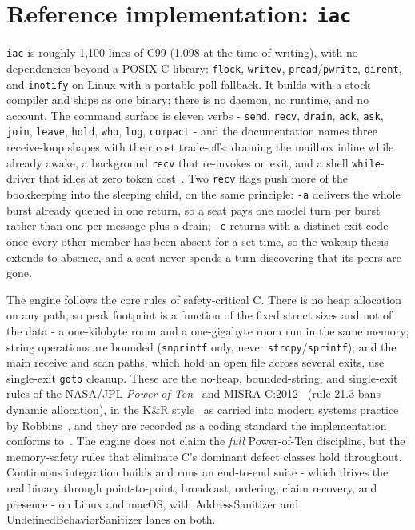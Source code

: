 \documentclass[11pt]{article}
\newcommand{\code}[1]{\texttt{#1}}
\begin{document}
\section{Reference implementation: \code{iac}}

\code{iac} is roughly 1,100 lines of C99 (1,098 at the time of writing), with no dependencies beyond a POSIX C library: \code{flock}, \code{writev}, \code{pread}/\code{pwrite}, \code{dirent}, and \code{inotify} on Linux with a portable poll fallback. It builds with a stock compiler and ships as one binary; there is no daemon, no runtime, and no account. The command surface is eleven verbs - \code{send}, \code{recv}, \code{drain}, \code{ack}, \code{ask}, \code{join}, \code{leave}, \code{hold}, \code{who}, \code{log}, \code{compact} - and the documentation names three receive-loop shapes with their cost trade-offs: draining the mailbox inline while already awake, a background \code{recv} that re-invokes on exit, and a shell \code{while}-driver that idles at zero token cost~\cite{skill}. Two \code{recv} flags push more of the bookkeeping into the sleeping child, on the same principle: \code{-a} delivers the whole burst already queued in one return, so a seat pays one model turn per burst rather than one per message plus a drain; \code{-e} returns with a distinct exit code once every other member has been absent for a set time, so the wakeup thesis extends to absence, and a seat never spends a turn discovering that its peers are gone.

The engine follows the core rules of safety-critical C. There is no heap allocation on any path, so peak footprint is a function of the fixed struct sizes and not of the data - a one-kilobyte room and a one-gigabyte room run in the same memory; string operations are bounded (\code{snprintf} only, never \code{strcpy}/\code{sprintf}); and the main receive and scan paths, which hold an open file across several exits, use single-exit \code{goto} cleanup. These are the no-heap, bounded-string, and single-exit rules of the NASA/JPL \emph{Power of Ten}~\cite{holzmann2006} and MISRA-C:2012~\cite{misra2012} (rule 21.3 bans dynamic allocation), in the K\&R style~\cite{kernighan1988} as carried into modern systems practice by Robbins~\cite{robbins2004}, and they are recorded as a coding standard the implementation conforms to~\cite{style}. The engine does not claim the \emph{full} Power-of-Ten discipline, but the memory-safety rules that eliminate C's dominant defect classes hold throughout. Continuous integration builds and runs an end-to-end suite - which drives the real binary through point-to-point, broadcast, ordering, claim recovery, and presence - on Linux and macOS, with AddressSanitizer and UndefinedBehaviorSanitizer lanes on both.
\end{document}
